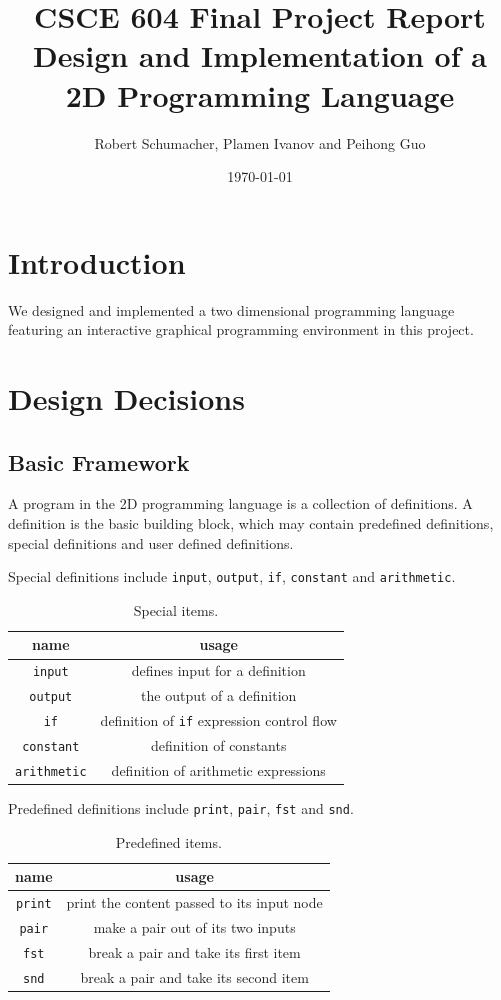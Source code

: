 \documentclass[12pt,UTF8,a4]{article}
\title{CSCE 604 Final Project Report \\ Design and Implementation of a 2D Programming Language}
\author{Robert Schumacher, Plamen Ivanov and Peihong Guo}
\date{\today}
\newcommand{\code}[1]{\texttt{#1}}
\begin{document}
\maketitle
\singlespacing

\section{Introduction}
We designed and implemented a two dimensional programming language featuring an interactive graphical programming environment in this project.

\section{Design Decisions}
\subsection{Basic Framework}
A program in the 2D programming language is a collection of definitions. A definition is the basic building block, which may contain predefined definitions, special definitions and user defined definitions.

Special definitions include \code{input}, \code{output}, \code{if}, \code{constant} and \code{arithmetic}.
\begin{table}[h]
\center
\begin{tabular}{c|c}
\hline
name & usage \\
\hline
\code{input} & defines input for a definition\\
\code{output} & the output of a definition\\
\code{if} & definition of \code{if} expression control flow \\
\code{constant} & definition of constants \\
\code{arithmetic} & definition of arithmetic expressions \\
\hline
\end{tabular}
\caption{Special items.}\label{tab:sitems}
\end{table}

Predefined definitions include \code{print}, \code{pair}, \code{fst} and \code{snd}.
\begin{table}[h]
\center
\begin{tabular}{c|c}
\hline
name & usage \\
\hline
\code{print} & print the content passed to its input node\\
\code{pair} & make a pair out of its two inputs\\
\code{fst} & break a pair and take its first item \\
\code{snd} & break a pair and take its second item \\
\hline
\end{tabular}
\caption{Predefined items.}\label{tab:pitems}
\end{table}
\end{document}
